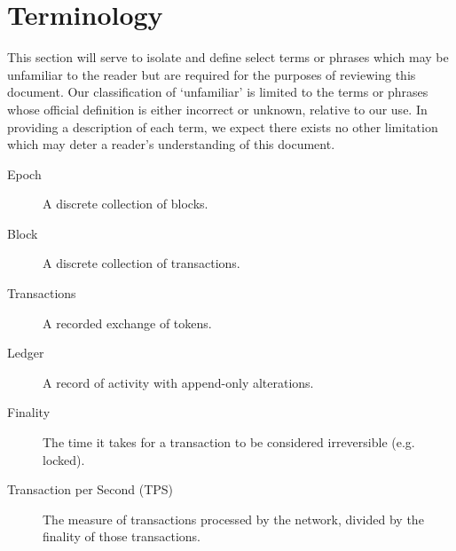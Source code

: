 \section{Terminology}\label{term}

This section will serve to isolate and define select terms or phrases which may be unfamiliar to the reader but are required for the purposes of reviewing this document. Our classification of ‘unfamiliar’ is limited to the terms or phrases whose official definition is either incorrect or unknown, relative to our use. In providing a description of each term, we expect there exists no other limitation which may deter a reader's understanding of this document.
\begin{description}

\item[Epoch] A discrete collection of blocks. 
\item[Block] A discrete collection of transactions.
\item[Transactions] A recorded exchange of tokens.
\item[Ledger] A record of activity with append-only alterations.
\item[Finality] The time it takes for a transaction to be considered irreversible (e.g. locked).
\item[Transaction per Second (TPS)] The measure of transactions processed by the network, divided by the finality of those transactions.

\end{description}